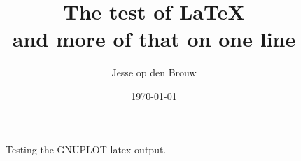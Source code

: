 \documentclass[12pt,a4paper,final,oneside,fleqn]{report}
\begin{document}
\author{Jesse op den Brouw}
\title{The test of \LaTeX \\ and more of that on one line}
\date{\today}

\lipsum[1]

\begin{figure}[h!]
  \footnotesize
  \centering
  
  \caption{Testing the GNUPLOT latex output.}
  \label{comb_divider}
\end{figure}


\lipsum[1]

\end{document}
